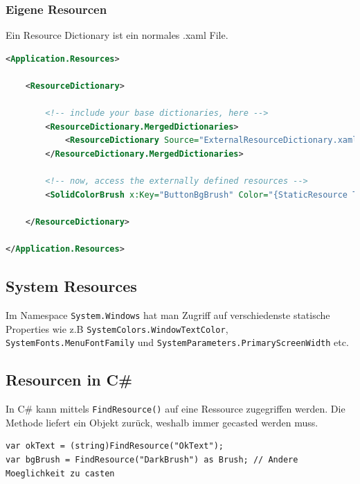 \subsubsection{Eigene Resourcen}
Ein Resource Dictionary ist ein normales .xaml File.
\begin{lstlisting}[caption=Eigene Resource Dictionaries, language=XML]
<Application.Resources>

	<ResourceDictionary>
		
		<!-- include your base dictionaries, here -->
		<ResourceDictionary.MergedDictionaries>
			<ResourceDictionary Source="ExternalResourceDictionary.xaml"/>
		</ResourceDictionary.MergedDictionaries>
		
		<!-- now, access the externally defined resources -->
		<SolidColorBrush x:Key="ButtonBgBrush" Color="{StaticResource ThemeColor1}" />
		
	</ResourceDictionary>
	
</Application.Resources>
\end{lstlisting}

\subsection{System Resources}
Im Namespace \lstinline|System.Windows| hat man Zugriff auf verschiedenste statische Properties wie z.B \lstinline|SystemColors.WindowTextColor|, \lstinline|SystemFonts.MenuFontFamily| und \lstinline|SystemParameters.PrimaryScreenWidth| etc.


\subsection{Resourcen in C\#}
In C\# kann mittels \lstinline|FindResource()| auf eine Ressource zugegriffen werden. Die Methode liefert ein Objekt zurück, weshalb immer gecasted werden muss.
\begin{lstlisting}[caption=Resources in C\#]
var okText = (string)FindResource("OkText");
var bgBrush = FindResource("DarkBrush") as Brush; // Andere Moeglichkeit zu casten
\end{lstlisting}


